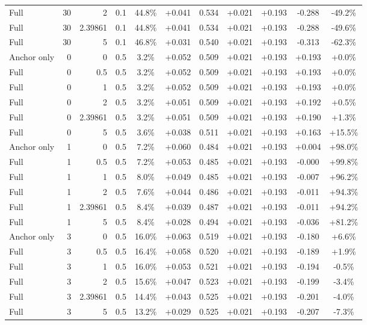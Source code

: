 \begin{table}[htbp]
\begin{tabular}{lrrrccccccc}
Full & 30 & 2 & 0.1 & 44.8\% & +0.041 & 0.534 & +0.021 & +0.193 & -0.288 & -49.2\% \\
Full & 30 & 2.39861 & 0.1 & 44.8\% & +0.041 & 0.534 & +0.021 & +0.193 & -0.288 & -49.6\% \\
Full & 30 & 5 & 0.1 & 46.8\% & +0.031 & 0.540 & +0.021 & +0.193 & -0.313 & -62.3\% \\
Anchor only & 0 & 0 & 0.5 & 3.2\% & +0.052 & 0.509 & +0.021 & +0.193 & +0.193 & +0.0\% \\
Full & 0 & 0.5 & 0.5 & 3.2\% & +0.052 & 0.509 & +0.021 & +0.193 & +0.193 & +0.0\% \\
Full & 0 & 1 & 0.5 & 3.2\% & +0.052 & 0.509 & +0.021 & +0.193 & +0.193 & +0.0\% \\
Full & 0 & 2 & 0.5 & 3.2\% & +0.051 & 0.509 & +0.021 & +0.193 & +0.192 & +0.5\% \\
Full & 0 & 2.39861 & 0.5 & 3.2\% & +0.051 & 0.509 & +0.021 & +0.193 & +0.190 & +1.3\% \\
Full & 0 & 5 & 0.5 & 3.6\% & +0.038 & 0.511 & +0.021 & +0.193 & +0.163 & +15.5\% \\
Anchor only & 1 & 0 & 0.5 & 7.2\% & +0.060 & 0.484 & +0.021 & +0.193 & +0.004 & +98.0\% \\
Full & 1 & 0.5 & 0.5 & 7.2\% & +0.053 & 0.485 & +0.021 & +0.193 & -0.000 & +99.8\% \\
Full & 1 & 1 & 0.5 & 8.0\% & +0.049 & 0.485 & +0.021 & +0.193 & -0.007 & +96.2\% \\
Full & 1 & 2 & 0.5 & 7.6\% & +0.044 & 0.486 & +0.021 & +0.193 & -0.011 & +94.3\% \\
Full & 1 & 2.39861 & 0.5 & 8.4\% & +0.039 & 0.487 & +0.021 & +0.193 & -0.011 & +94.2\% \\
Full & 1 & 5 & 0.5 & 8.4\% & +0.028 & 0.494 & +0.021 & +0.193 & -0.036 & +81.2\% \\
Anchor only & 3 & 0 & 0.5 & 16.0\% & +0.063 & 0.519 & +0.021 & +0.193 & -0.180 & +6.6\% \\
Full & 3 & 0.5 & 0.5 & 16.4\% & +0.058 & 0.520 & +0.021 & +0.193 & -0.189 & +1.9\% \\
Full & 3 & 1 & 0.5 & 16.0\% & +0.053 & 0.521 & +0.021 & +0.193 & -0.194 & -0.5\% \\
Full & 3 & 2 & 0.5 & 15.6\% & +0.047 & 0.523 & +0.021 & +0.193 & -0.199 & -3.4\% \\
Full & 3 & 2.39861 & 0.5 & 14.4\% & +0.043 & 0.525 & +0.021 & +0.193 & -0.201 & -4.0\% \\
Full & 3 & 5 & 0.5 & 13.2\% & +0.029 & 0.525 & +0.021 & +0.193 & -0.207 & -7.3\% \\

\end{tabular}
\end{table}
